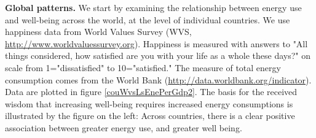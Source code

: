 \documentclass[10pt, letterpaper]{article}
\begin{document}
\begin{spacing}{1.4}







\textbf{Global patterns.} We start by examining the relationship between energy use and well-being across the world, at the level of individual countries.  %
We use happiness data from World Values Survey
(WVS, \url{http://www.worldvaluessurvey.org}).  Happiness is measured with answers to
"All things considered, how satisfied are you with your life as a whole these
days?" on scale from 1="dissatisfied" to 10="satisfied."
The measure of total energy  consumption comes from the World Bank
(\url{http://data.worldbank.org/indicator}). Data are plotted in figure \ref{couWvsLsEnePerGdp2}.
% 
%
The basis for the received wisdom that increasing well-being requires increased energy consumptions is illustrated by the figure on the left: Across countries, there is a clear positive association between greater energy use, and greater well being.


\end{spacing}
\end{document}
